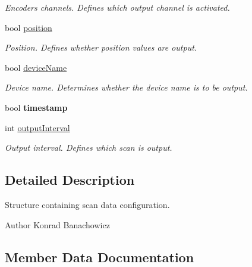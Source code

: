 \begin{DoxyCompactItemize}
\begin{DoxyCompactList}\small\item\em Encoders channels. Defines which output channel is activated. \end{DoxyCompactList}\item 
\mbox{\label{structscanDataCfg_a030fbc4042bf4475cab57ac8f9038249}} 
bool \hyperlink{structscanDataCfg_a030fbc4042bf4475cab57ac8f9038249}{position}
\begin{DoxyCompactList}\small\item\em Position. Defines whether position values are output. \end{DoxyCompactList}\item 
\mbox{\label{structscanDataCfg_adf940c03dd0cb2a042ad91354da2b950}} 
bool \hyperlink{structscanDataCfg_adf940c03dd0cb2a042ad91354da2b950}{device\+Name}
\begin{DoxyCompactList}\small\item\em Device name. Determines whether the device name is to be output. \end{DoxyCompactList}\item 
\mbox{\label{structscanDataCfg_a45660f9afd21f0ae19ea2c7e723d2134}} 
bool {\bfseries timestamp}
\item 
int \hyperlink{structscanDataCfg_a7ceeb0e74450672e5872dd774adc2ce8}{output\+Interval}
\begin{DoxyCompactList}\small\item\em Output interval. Defines which scan is output. \end{DoxyCompactList}\end{DoxyCompactItemize}


\subsection{Detailed Description}
Structure containing scan data configuration. 

\begin{DoxyAuthor}{Author}
Konrad Banachowicz 
\end{DoxyAuthor}


\subsection{Member Data Documentation}
\mbox{\label{structscanDataCfg_a7ceeb0e74450672e5872dd774adc2ce8}} 
